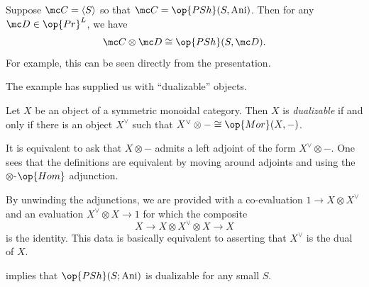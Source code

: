 \documentclass[../notes.tex]{subfiles}
\begin{document}
\begin{example} \label{ex:dualizable-object}
	Suppose $\mc C=\langle S\rangle$ so that $\mc C=\op{PSh}(S,\mathrm{Ani})$. Then for any $\mc D\in\op{Pr}^L$, we have
	\[\mc C\otimes\mc D\cong\op{PSh}(S,\mc D).\]
	For example, this can be seen directly from the presentation.
\end{example}
The example has supplied us with ``dualizable'' objects.
\begin{definition}[dualizable]
	Let $X$ be an object of a symmetric monoidal category. Then $X$ is \textit{dualizable} if and only if there is an object $X^\lor$ such that $X^\lor\otimes-\cong\op{Mor}(X,-)$.
\end{definition}
\begin{remark}
	It is equivalent to ask that $X\otimes-$ admits a left adjoint of the form $X^\lor\otimes-$. One sees that the definitions are equivalent by moving around adjoints and using the $\otimes$-$\op{Hom}$ adjunction.
\end{remark}
\begin{remark}
	By unwinding the adjunctions, we are provided with a co-evaluation $1\to X\otimes X^\lor$ and an evaluation $X^\lor\otimes X\to1$ for which the composite
	\[X\to X\otimes X^\lor\otimes X\to X\]
	is the identity. This data is basically equivalent to asserting that $X^\lor$ is the dual of $X$.
\end{remark}
\begin{example}
	 implies that $\op{PSh}(S;\mathrm{Ani})$ is dualizable for any small $S$.
\end{example}
\end{document}
